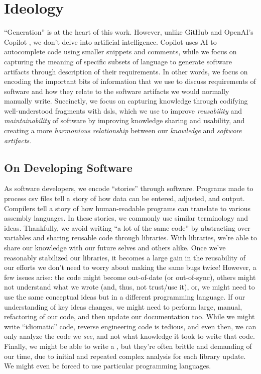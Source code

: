 \chapter[Ideology]{Ideology\footnotemark}
\label{chap:ideology}

``Generation'' is at the heart of this work. However, unlike GitHub and OpenAI's
Copilot \cite{Copilot}, we don't delve into artificial intelligence. Copilot
uses AI to autocomplete code using smaller snippets and comments, while we focus
on capturing the meaning of specific subsets of language to generate software
artifacts through description of their requirements. In other words, we focus on
encoding the important bits of information that we use to discuss requirements
of software and how they relate to the software artifacts we would normally
manually write. Succinctly, we focus on capturing knowledge through codifying
well-understood fragments with \acsp{dsl}, which we use to improve
\textit{reusability} and \textit{maintainability} of software by improving
knowledge sharing and usability, and creating a more \textit{harmonious
relationship} between our \textit{knowledge} and \textit{software artifacts}.

\section{On Developing Software}
\label{chap:ideology:sec:on_developing_software}

As software developers, we encode ``stories'' through software. Programs made to
process \acs{csv} files tell a story of how data can be entered, adjusted, and
output. Compilers tell a story of how human-readable programs can translate to
various assembly languages. In these stories, we commonly use similar
terminology and ideas. Thankfully, we avoid writing ``a lot of the same code''
by abstracting over variables and sharing reusable code through libraries. With
libraries, we're able to share our knowledge with our future selves and others
alike. Once we've reasonably stabilized our libraries, it becomes a large gain
in the reusability of our efforts \textemdash we don't need to worry about
making the same bugs twice! However, a few issues arise: the code might become
out-of-date (or out-of-sync), others might not understand what we wrote (and,
thus, not trust/use it), or, we might need to use the same conceptual ideas but
in a different programming language. If our understanding of key ideas changes,
we might need to perform large, manual, refactoring of our code, and then update
our documentation too. While we might write ``idiomatic'' code, reverse
engineering code is tedious, and even then, we can only analyze the code we
\textit{see}, and not what knowledge it took to write that code. Finally, we
might be able to write a , but they're often brittle and demanding of
our time, due to initial and repeated complex analysis for each library update.
We might even be forced to use particular programming languages.

